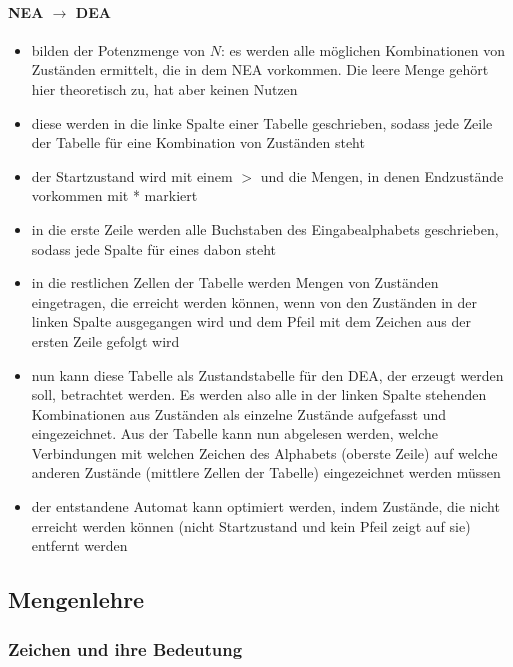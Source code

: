 \documentclass{article}
\begin{document}
	\paragraph{NEA $\rightarrow$ DEA}
	\begin{itemize}
		\item bilden der Potenzmenge von $N$: es werden alle möglichen Kombinationen von Zuständen ermittelt, die in dem NEA vorkommen. Die leere Menge gehört hier theoretisch zu, hat aber keinen Nutzen
		\item diese werden in die linke Spalte einer Tabelle geschrieben, sodass jede Zeile der Tabelle für eine Kombination von Zuständen steht
		\item der Startzustand wird mit einem $>$ und die Mengen, in denen Endzustände vorkommen mit * markiert
		\item in die erste Zeile werden alle Buchstaben des Eingabealphabets geschrieben, sodass jede Spalte für eines dabon steht
		\item in die restlichen Zellen der Tabelle werden Mengen von Zuständen eingetragen, die erreicht werden können, wenn von den Zuständen in der linken Spalte ausgegangen wird und dem Pfeil mit dem Zeichen aus der ersten Zeile gefolgt wird
		\item nun kann diese Tabelle als Zustandstabelle für den DEA, der erzeugt werden soll, betrachtet werden. Es werden also alle in der linken Spalte stehenden Kombinationen aus Zuständen als einzelne Zustände aufgefasst und eingezeichnet. Aus der Tabelle kann nun abgelesen werden, welche Verbindungen mit welchen Zeichen des Alphabets (oberste Zeile) auf welche anderen Zustände (mittlere Zellen der Tabelle) eingezeichnet werden müssen
		\item der entstandene Automat kann optimiert werden, indem Zustände, die nicht erreicht werden können (nicht Startzustand und kein Pfeil zeigt auf sie) entfernt werden
	\end{itemize}
	
	\subsection{Mengenlehre}
	
	\subsubsection{Zeichen und ihre Bedeutung}
	
\end{document}
